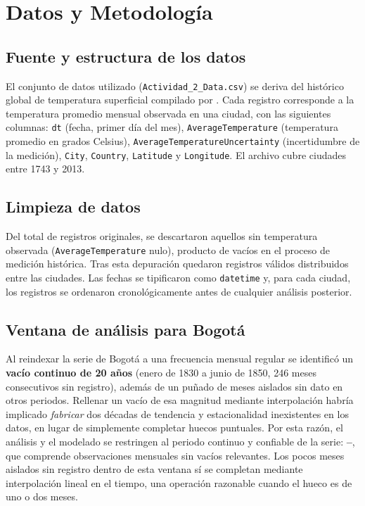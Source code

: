 \section{Datos y Metodología}
\label{sec:datos-metodologia}

\subsection{Fuente y estructura de los datos}

El conjunto de datos utilizado (\texttt{Actividad\_2\_Data.csv}) se deriva del histórico
global de temperatura superficial compilado por \citet{berkeleyearth}. Cada registro
corresponde a la temperatura promedio mensual observada en una ciudad, con las siguientes
columnas: \texttt{dt} (fecha, primer día del mes), \texttt{Average\-Temperature} (temperatura
promedio en grados Celsius), \texttt{AverageTemperatureUncertainty} (incertidumbre de la
medición), \texttt{City}, \texttt{Country}, \texttt{Latitude} y \texttt{Longitude}. El
archivo cubre \DatasetCityCount{} ciudades entre 1743 y 2013.

\subsection{Limpieza de datos}

Del total de registros originales, se descartaron aquellos sin temperatura observada
(\texttt{Average\-Temperature} nulo), producto de vacíos en el proceso de medición histórica.
Tras esta depuración quedaron \DatasetRowCount{} registros válidos distribuidos entre las
\DatasetCityCount{} ciudades. Las fechas se tipificaron como \texttt{datetime} y, para cada
ciudad, los registros se ordenaron cronológicamente antes de cualquier análisis posterior.

\subsection{Ventana de análisis para Bogotá}

Al reindexar la serie de Bogotá a una frecuencia mensual regular se identificó un
\textbf{vacío continuo de 20 años} (enero de 1830 a junio de 1850, 246 meses consecutivos sin
registro), además de un puñado de meses aislados sin dato en otros periodos. Rellenar un
vacío de esa magnitud mediante interpolación habría implicado \emph{fabricar} dos décadas de
tendencia y estacionalidad inexistentes en los datos, en lugar de simplemente completar
huecos puntuales. Por esta razón, el análisis y el modelado se restringen al periodo
continuo y confiable de la serie: \textbf{\AnalysisStartYear{}--\AnalysisEndYear{}}, que
comprende \BogotaObsCount{} observaciones mensuales sin vacíos relevantes. Los pocos meses
aislados sin registro dentro de esta ventana sí se completan mediante interpolación lineal
en el tiempo, una operación razonable cuando el hueco es de uno o dos meses.

